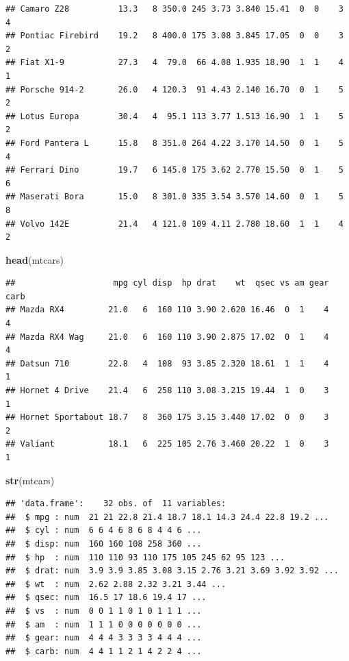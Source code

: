 \documentclass[]{report}
\newenvironment{Shaded}{\begin{snugshade}}{\end{snugshade}}
\newcommand{\KeywordTok}[1]{\textcolor[rgb]{0.13,0.29,0.53}{\textbf{#1}}}
\newcommand{\NormalTok}[1]{#1}
\begin{document}
\begin{verbatim}
## Camaro Z28          13.3   8 350.0 245 3.73 3.840 15.41  0  0    3    4
## Pontiac Firebird    19.2   8 400.0 175 3.08 3.845 17.05  0  0    3    2
## Fiat X1-9           27.3   4  79.0  66 4.08 1.935 18.90  1  1    4    1
## Porsche 914-2       26.0   4 120.3  91 4.43 2.140 16.70  0  1    5    2
## Lotus Europa        30.4   4  95.1 113 3.77 1.513 16.90  1  1    5    2
## Ford Pantera L      15.8   8 351.0 264 4.22 3.170 14.50  0  1    5    4
## Ferrari Dino        19.7   6 145.0 175 3.62 2.770 15.50  0  1    5    6
## Maserati Bora       15.0   8 301.0 335 3.54 3.570 14.60  0  1    5    8
## Volvo 142E          21.4   4 121.0 109 4.11 2.780 18.60  1  1    4    2
\end{verbatim}

\begin{Shaded}
\begin{Highlighting}[]
\KeywordTok{head}\NormalTok{(mtcars)}
\end{Highlighting}
\end{Shaded}

\begin{verbatim}
##                    mpg cyl disp  hp drat    wt  qsec vs am gear carb
## Mazda RX4         21.0   6  160 110 3.90 2.620 16.46  0  1    4    4
## Mazda RX4 Wag     21.0   6  160 110 3.90 2.875 17.02  0  1    4    4
## Datsun 710        22.8   4  108  93 3.85 2.320 18.61  1  1    4    1
## Hornet 4 Drive    21.4   6  258 110 3.08 3.215 19.44  1  0    3    1
## Hornet Sportabout 18.7   8  360 175 3.15 3.440 17.02  0  0    3    2
## Valiant           18.1   6  225 105 2.76 3.460 20.22  1  0    3    1
\end{verbatim}

\begin{Shaded}
\begin{Highlighting}[]
\KeywordTok{str}\NormalTok{(mtcars)}
\end{Highlighting}
\end{Shaded}

\begin{verbatim}
## 'data.frame':    32 obs. of  11 variables:
##  $ mpg : num  21 21 22.8 21.4 18.7 18.1 14.3 24.4 22.8 19.2 ...
##  $ cyl : num  6 6 4 6 8 6 8 4 4 6 ...
##  $ disp: num  160 160 108 258 360 ...
##  $ hp  : num  110 110 93 110 175 105 245 62 95 123 ...
##  $ drat: num  3.9 3.9 3.85 3.08 3.15 2.76 3.21 3.69 3.92 3.92 ...
##  $ wt  : num  2.62 2.88 2.32 3.21 3.44 ...
##  $ qsec: num  16.5 17 18.6 19.4 17 ...
##  $ vs  : num  0 0 1 1 0 1 0 1 1 1 ...
##  $ am  : num  1 1 1 0 0 0 0 0 0 0 ...
##  $ gear: num  4 4 4 3 3 3 3 4 4 4 ...
##  $ carb: num  4 4 1 1 2 1 4 2 2 4 ...
\end{verbatim}
\end{document}
